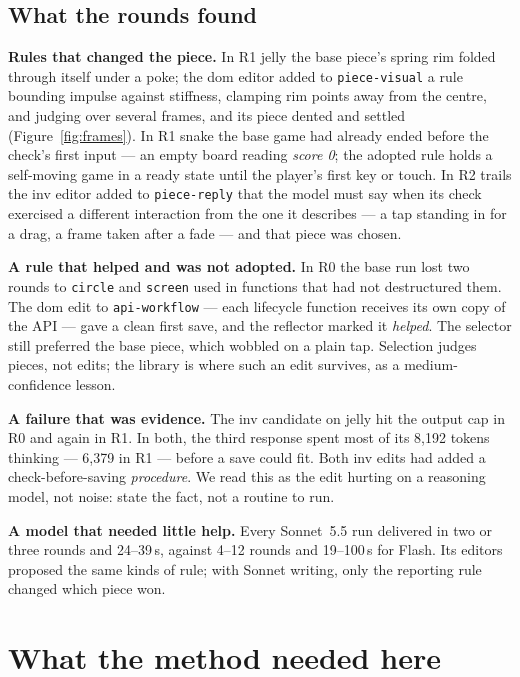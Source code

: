 \documentclass[10pt,letterpaper,twocolumn]{article}
\newcommand{\code}[1]{\texttt{#1}}
\begin{document}
\subsection{What the rounds found}
\textbf{Rules that changed the piece.} In R1 jelly the base piece's spring rim
folded through itself under a poke; the dom editor added to
\code{piece-visual} a rule bounding impulse against stiffness, clamping rim
points away from the centre, and judging over several frames, and its piece
dented and settled (Figure~\ref{fig:frames}). In R1 snake the base game had
already ended before the check's first input --- an empty board reading
\emph{score 0}; the adopted rule holds a self-moving game in a ready state
until the player's first key or touch. In R2 trails the inv editor added to
\code{piece-reply} that the model must say when its check exercised a different
interaction from the one it describes --- a tap standing in for a drag, a frame
taken after a fade --- and that piece was chosen.

\textbf{A rule that helped and was not adopted.} In R0 the base run lost two
rounds to \code{circle} and \code{screen} used in functions that had not
destructured them. The dom edit to \code{api-workflow} --- each lifecycle
function receives its own copy of the API --- gave a clean first save, and the
reflector marked it \emph{helped}. The selector still preferred the base piece,
which wobbled on a plain tap. Selection judges pieces, not edits; the library
is where such an edit survives, as a medium-confidence lesson.

\textbf{A failure that was evidence.} The inv candidate on jelly hit the output
cap in R0 and again in R1. In both, the third response spent most of its 8,192
tokens thinking --- 6,379 in R1 --- before a save could fit. Both inv edits had
added a check-before-saving \emph{procedure}. We read this as the edit hurting
on a reasoning model, not noise: state the fact, not a routine to run.

\textbf{A model that needed little help.} Every Sonnet~5.5 run delivered in two
or three rounds and 24--39\,s, against 4--12 rounds and 19--100\,s for Flash.
Its editors proposed the same kinds of rule; with Sonnet writing, only the
reporting rule changed which piece won.



\section{What the method needed here}
\label{sec:lessons}
\end{document}
